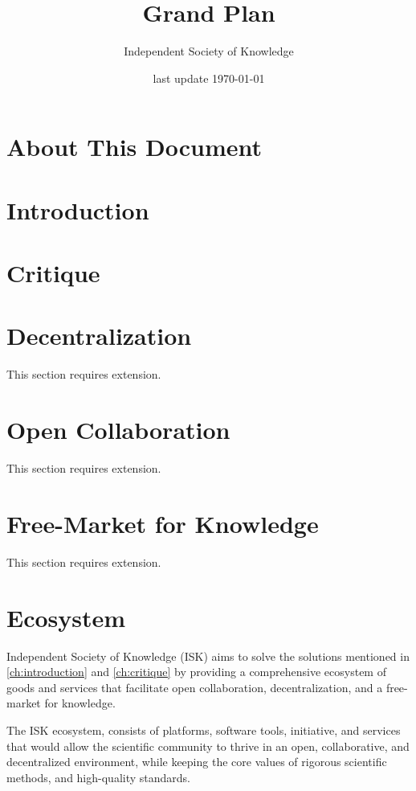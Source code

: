 \documentclass[11pt]{book}
\title{Grand Plan}
\author{Independent Society of Knowledge}
\date{last update \today}
\begin{document}
    \maketitle
    \tableofcontents
    \newpage


    \chapter{About This Document}\label{ch:about-this-document}
    


    \chapter{Introduction}\label{ch:introduction}
    


    \chapter{Critique}\label{ch:critique}
    

    \chapter{Decentralization}\label{ch:decentralization}
    This section requires extension.
    \chapter{Open Collaboration}\label{ch:open-collaboration}
    This section requires extension.
    \chapter{Free-Market for Knowledge}\label{ch:free-market-for-knowledge}
    This section requires extension.

    \chapter{Ecosystem}\label{ch:ecosystem}
    Independent Society of Knowledge (ISK) aims to solve the solutions mentioned in \autoref{ch:introduction} and \autoref{ch:critique} by providing a comprehensive ecosystem of goods and services that facilitate open collaboration, decentralization, and a free-market for knowledge.

    The ISK ecosystem, consists of platforms, software tools, initiative, and services that would allow the scientific community to thrive in an open, collaborative, and decentralized environment, while keeping the core values of rigorous scientific methods, and high-quality standards.
\end{document}
